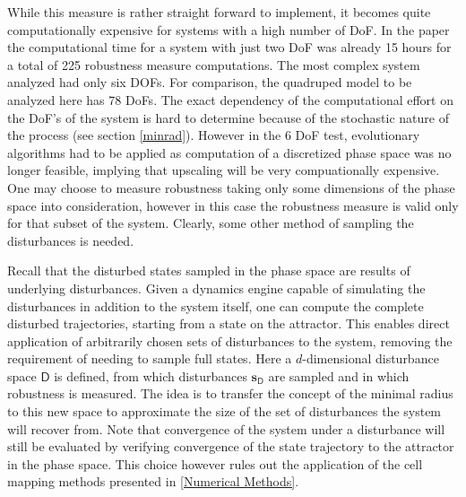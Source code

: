     While this measure is rather straight forward to implement, it becomes quite computationally expensive for systems with a high number of DoF. 
    In the paper the computational time for a system with just two DoF was already 15 hours for a total of 225 robustness measure computations. The most complex system analyzed had only six DOFs. For comparison, the quadruped model to be analyzed here has 78 DoFs. The exact dependency of the computational effort on the DoF's of the system is hard to determine because of the stochastic nature of the process (see section \ref{minrad}). However in the 6 DoF test, evolutionary algorithms had to be applied as computation of a discretized phase space was no longer feasible, implying that upscaling will be very compuationally expensive. One may choose to measure robustness taking only some dimensions of the phase space into consideration, however in this case the robustness measure is valid only for that subset of the system. Clearly, some other method of sampling the disturbances is needed.

    Recall that the disturbed states sampled in the phase space are results of underlying disturbances. Given a dynamics engine capable of simulating the disturbances in addition to the system itself, one can compute the complete disturbed trajectories, starting from a state on the attractor. This enables direct application of arbitrarily chosen sets of disturbances to the system, removing the requirement of needing to sample full states. Here a $d$-dimensional disturbance space $\mathsf{D}$ is defined, from which disturbances $\mathbf{s}_{\mathsf{D}}$ are sampled and in which robustness is measured. The idea is to transfer the concept of the minimal radius to this new space to approximate the size of the set of disturbances the system will recover from. Note that convergence of the system under a disturbance will still be evaluated by verifying convergence of the state trajectory to the attractor in the phase space. This choice however rules out the application of the cell mapping methods presented in \ref{Numerical Methods}. 

